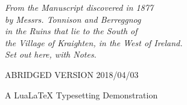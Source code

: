 \documentclass{novel} %
\begin{document}




\frontmatter %


\thispagestyle{empty}
\vspace*{6\nbs} %
{\centering{}\par}
\cleartorecto %


\thispagestyle{empty}
\vspace*{4\nbs}
{\centering{}\par}
\vspace{2\nbs} %
{\centering{}\par}
\vspace{2\nbs}
\begin{center}
\textit{From the Manuscript discovered in 1877\\
by Messrs. Tonnison and Berreggnog\\
in the Ruins that lie to the South of\\
the Village of Kraighten, in the West of Ireland.\\
Set out here, with Notes.}\par
\end{center}
\vspace{3\nbs}
{\centering{}\par}
\vspace{3\nbs}
{\centering\textsc{ABRIDGED VERSION 2018/04/03}\par}
\vfill %
{\centering A LuaLaTeX Typesetting Demonstration\par}
\clearpage
\end{document}
